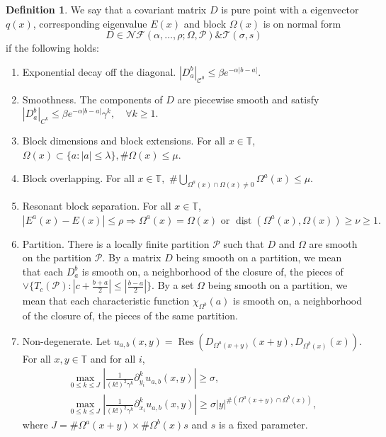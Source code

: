 \documentclass[11pt]{amsart}
\theoremstyle{remark}
\theoremstyle{definition}
\newtheorem{definition}{Definition}
\newcommand{\T}{{\mathbf T}}
\def\T{{\mathbb T}}
\begin{document}
\begin{definition}\cite{E} \label{normal}
    We say that a covariant matrix $D$ is pure point with a eigenvector $q(x)$, corresponding eigenvalue $E(x)$ and block $\Omega(x)$ is on normal form 
$$D \in \mathcal{N} \mathcal{F}(\alpha, \ldots, \rho ; \Omega, \mathcal{P}) \& \mathcal{T}(\sigma, s)$$
if the following holds:
\begin{enumerate}
    \item Exponential decay off the diagonal.
$
|D_a^b|_{\mathcal{C}^0} \leq \beta e^{-\alpha|b-a|}.
$
\item Smoothness. The components of $D$ are piecewise smooth and satisfy 
$
|D_a^b|_{C^k} \leq \beta e^{-\alpha|b-a|} \gamma^k, \quad \forall k \geq 1.
$
\item Block dimensions and block extensions.  For all $x \in \T$,
$
\Omega(x) \subset\{a:|a| \leq \lambda\}, 
\# \Omega(x) \leq \mu.
$


\item Block overlapping. For all $x \in \T,$
$
\# \bigcup_{\Omega^a(x) \cap \Omega(x) \neq 0} \Omega^a(x) \leq \mu.
$
\item Resonant block separation. For all $x \in \T$,
$
\left|E^a(x)-E(x)\right| \leq \rho \Longrightarrow  \Omega^a(x)=\Omega(x) \text { or } \underline{\operatorname{dist}}\left(\Omega^a(x), \Omega(x)\right) \geq \nu \geq 1.
$

\item Partition. There is a locally finite partition $\mathcal{P}$ such that
$D$  and  $\Omega$  are smooth on the partition  $\mathcal{P}.
$
By a matrix $D$ being smooth on a partition, we mean that each $D_a^b$ is smooth on, a neighborhood of the closure of, the pieces of
$
\vee\{T_c(\mathcal{P}):\left|c+\frac{b+a}{2}\right| \leq|\frac{b-a}{2}|\}.
$
By a set $\Omega$ being smooth on a partition, we mean that each characteristic function $\chi_{\Omega^b}(a)$ is smooth on, a neighborhood of the closure of, the pieces of the same partition.
\item Non-degenerate. Let $
u_{a, b}(x, y)=\operatorname{Res}\left(D_{\Omega^a(x+y)}(x+y), D_{\Omega^b(x)}(x)\right).
$ For all $x, y \in \T$ and for all $i$,
$$
\begin{gathered}
\max _{0 \leq k \leq J}|\frac{1}{(k!)^2 \gamma^k} \partial_{y_i}^k u_{a, b}(x, y)| \geq \sigma, \\
\max _{0 \leq k \leq J}|\frac{1}{(k!)^2 \gamma^k} \partial_{x_i}^k u_{a, b}(x, y)| \geq \sigma|y|^{\#(\Omega^a(x+y) \cap \Omega^b(x))},
\end{gathered}
$$
where $J=\# \Omega^a(x+y) \times \# \Omega^b(x) s$ and $s$ is a fixed parameter.
\end{enumerate}


\end{definition}
\end{document}
